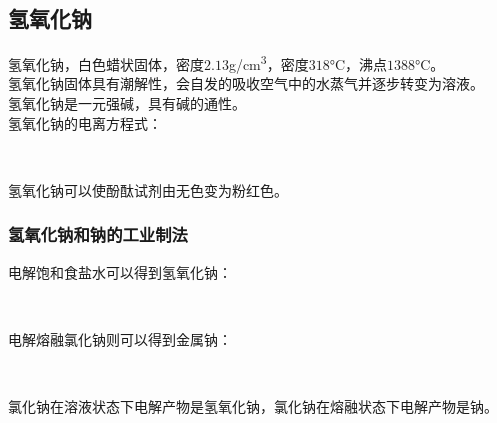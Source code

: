 \documentclass[UTF8]{ctexart}
\begin{document}
\subsection{氢氧化钠}
    氢氧化钠，白色蜡状固体，密度$2.13$\si{g/cm^3}，密度$318$\si{\degreeCelsius}，沸点$1388$\si{\degreeCelsius}。\\[3mm]
    氢氧化钠固体具有潮解性，会自发的吸收空气中的水蒸气并逐步转变为溶液。\\[3mm]
    氢氧化钠是一元强碱，具有碱的通性。\\[3mm]
    氢氧化钠的电离方程式：
    \begin{center}
        \\[6mm]
    \end{center}
    氢氧化钠可以使酚酞试剂由无色变为粉红色。

\subsubsection{氢氧化钠和钠的工业制法}
    电解饱和食盐水可以得到氢氧化钠：
    \begin{center}
        \\[6mm]
    \end{center}
    电解熔融氯化钠则可以得到金属钠：
    \begin{center}
        \\[6mm]
    \end{center}
    氯化钠在溶液状态下电解产物是氢氧化钠，氯化钠在熔融状态下电解产物是钠。

\newpage
\end{document}
